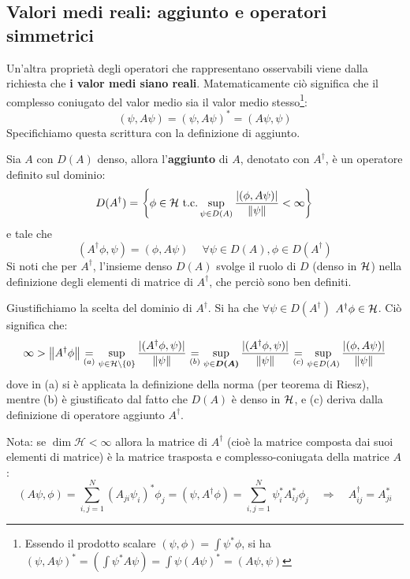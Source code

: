 \documentclass[FisicaTeorica.tex]{subfiles}
\begin{document}
\subsection{Valori medi reali: aggiunto e operatori simmetrici}
Un'altra proprietà degli operatori che rappresentano osservabili viene dalla richiesta che \textbf{i valor medi siano reali}. Matematicamente ciò significa che il complesso coniugato del valor medio sia il valor medio stesso\footnote{Essendo il prodotto scalare $(\psi, \phi) = \int \psi^* \phi$, si ha $(\psi, A\psi)^* = \left (\int \psi^* A\psi\right ) = \int \psi (A\psi)^* = (A\psi, \psi)$}:
	\[
	\left(\psi,A\psi\right)=\left(\psi,A\psi\right)^*=\left(A\psi,\psi\right)
	\]
	Specifichiamo questa scrittura con la definizione di aggiunto.
	\begin{dfn}
	Sia $A$ con $D(A)$ denso, allora l'\textbf{aggiunto} di $A$, denotato con $A^\dag$, è un operatore definito sul dominio:
	\[
	D(A^\dag) = \left \{\phi \in \mathcal{H} \text{ t.c.} \sup_{\psi \in D(A)} \frac{|(\phi, A\psi)|}{\left\lVert\psi\right\rVert}< \infty \right \}
	\]
	e tale che
	\[
	(A^\dag \phi,\psi) = (\phi, A\psi)\> \quad \forall \psi \in D\left(A\right), \phi \in D\left(A^\dag \right)
	\]
	Si noti che per $A^\dag$, l'insieme denso $D(A)$ svolge il ruolo di $D$ (denso in $\mathcal{H}$) nella definizione degli elementi di matrice di $A^\dag$, che perciò sono ben definiti.
	\end{dfn}
	\begin{appr}
	Giustifichiamo la scelta del dominio di $A^\dag$. Si ha che $\forall \psi \in D(A^\dag)$ $A^\dag \phi \in \mathcal{H}$. Ciò significa che:
	\[
	\infty > \left\lVert A^\dag \phi\right\rVert \underset{(a)}{=} \sup_{\psi \in \mathcal{H}\setminus \{0\}} \frac{|(A^\dag\phi,\psi)|}{\left\lVert\psi\right\rVert} \underset{(b)}{=} \sup_{\psi \in \bm{D(A)}} \frac{|(A^\dag\phi, \psi)|}{\left\lVert\psi\right\rVert} \underset{(c)}{=} \sup_{\psi \in D(A)} \frac{|(\phi,A\psi)|}{\left\lVert\psi\right\rVert}
	\]
	dove in (a) si è applicata la definizione della norma (per teorema di Riesz), mentre (b) è giustificato dal fatto che $D(A)$ è denso in $\mathcal{H}$, e (c) deriva dalla definizione di operatore aggiunto $A^\dag$.
	\end{appr}
	Nota: se $\dim{\mathcal{H}<\infty}$ allora la matrice di $A^\dag$ (cioè la matrice composta dai suoi elementi di matrice) è la matrice trasposta e complesso-coniugata della matrice $A$:
	\[
	\left(A\psi,\phi\right)=\sum_{i,j=1}^{N}{\left(A_{ji}\psi_i\right)^*\phi_j=\left(\psi,A^\dag\phi\right)=\sum_{i,j=1}^{N}{\psi_i^* A_{ij}^*\phi_j} \quad \Rightarrow \quad A_{ij}^\dag=A_{ji}^*}
	\]
\end{document}
